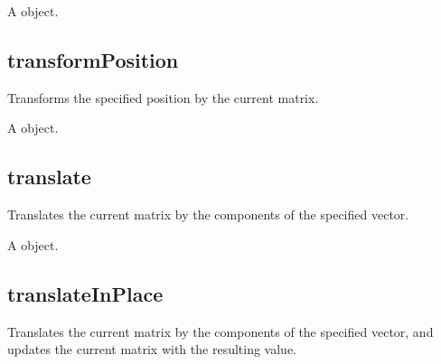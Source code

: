\documentclass[letterpaper,12pt,english,openany,oneside]{sphinxmanual}
\begin{document}
A  object.


\subsection{transformPosition}
\label{\detokenize{JS_3D_API:transformposition}}
Transforms the specified position by the current matrix.

\label{\detokenize{JS_3D_API:syntax-61}}

\begin{sphinxVerbatim}[commandchars=\\\{\}]
\end{sphinxVerbatim}
\label{\detokenize{JS_3D_API:parameters-47}}

\label{\detokenize{JS_3D_API:section-66}}\label{\detokenize{JS_3D_API:returns-62}}

A  object.


\subsection{translate}
\label{\detokenize{JS_3D_API:translate}}
Translates the current matrix by the components of the specified vector.

\label{\detokenize{JS_3D_API:syntax-62}}

\begin{sphinxVerbatim}[commandchars=\\\{\}]
\end{sphinxVerbatim}
\label{\detokenize{JS_3D_API:parameters-48}}

\label{\detokenize{JS_3D_API:section-67}}\label{\detokenize{JS_3D_API:returns-63}}

A  object.


\subsection{translateInPlace}
\label{\detokenize{JS_3D_API:translateinplace}}
Translates the current matrix by the components of the specified vector, and updates the current matrix with the resulting value.
\end{document}
